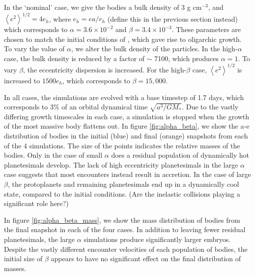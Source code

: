 \documentclass[twocolumn]{aastex63}
\begin{document}
In the `nominal' case, we give the bodies a bulk density of 3 g cm$^{-3}$, and $\left< e^{2} \right>^{1/2} = 4 e_{h}$, where $e_{h} = e a/r_{h}$ (define this in the previous section instead) which corresponds to $\alpha = 3.6 \times 10^{-2}$ and $\beta = 3.4 \times 10^{-3}$. These parameters are chosen to match the initial conditions of \citet{kokubo98}, which gave rise to oligarchic growth. To vary the value of $\alpha$, we alter the bulk density of the particles. In the high-$\alpha$ case, the bulk density is reduced by a factor of $\sim$ 7100, which produces $\alpha = 1$. To vary $\beta$, the eccentricity dispersion is increased. For the high-$\beta$ case, $\left< e^{2} \right>^{1/2}$ is increased to $1500 e_{h}$, which corresponds to $\beta = 15,000$.

In all cases, the simulations are evolved with a base timestep of 1.7 days, which corresponds to 3\% of an orbital dynamical time $\sqrt{a^3/G M_{*}}$. Due to the vastly differing growth timescales in each case, a simulation is stopped when the growth of the most massive body flattens out. In figure \ref{fig:alpha_beta}, we show the a-e distribution of bodies in the initial (blue) and final (orange) snapshots from each of the 4 simulations. The size of the points indicates the relative masses of the bodies. Only in the case of small $\alpha$ does a residual population of dynamically hot planetesimals develop. The lack of high eccentricity planetesimals in the large $\alpha$ case suggests that most encounters instead result in accretion. In the case of large $\beta$, the protoplanets and remaining planetesimals end up in a dynamically cool state, compared to the initial conditions. (Are the inelastic collisions playing a significant role here?)

In figure \ref{fig:alpha_beta_mass}, we show the mass distribution of bodies from the final snapshot in each of the four cases. In addition to leaving fewer residual planetesimals, the large $\alpha$ simulations produce significantly larger embryos. Despite the vastly different encounter velocities of each population of bodies, the initial size of $\beta$ appears to have no significant effect on the final distribution of masses.
\end{document}
